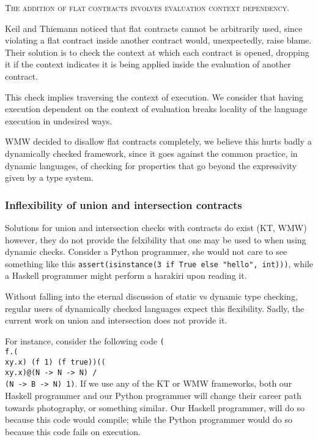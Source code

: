 \textsc{The addition of flat contracts involves evaluation context dependency.}

Keil and Thiemann noticed that flat contracts cannot be arbitrarily used, since
violating a flat contract inside another contract would, unexpectedly, raise blame.
Their solution is to check the context at which each contract is opened, dropping
it if the context indicates it is being applied inside the evaluation of another
contract.

This check implies traversing the context of execution.
We consider that having execution dependent on the context
of evaluation breaks locality of
the language execution in undesired ways.

WMW decided to disallow flat contracts completely,
we believe this hurts badly a dynamically checked framework, since it goes against
the common practice, in dynamic languages, of checking for properties
that go beyond the expressivity given by a type system.


\subsubsection*{Inflexibility of union and intersection contracts}

Solutions for union and intersection checks with contracts do exist (KT, WMW) however,
they do not provide the felxibility that one may be used to when using dynamic checks.
Consider a Python programmer, she would not care to see something like this
\texttt{assert(isinstance(3 if True else "hello", int)))}, while a Haskell programmer
might perform a harakiri upon reading it.

Without falling into the eternal discussion of static vs dynamic type checking,
regular users of dynamically checked languages expect this flexibility.
Sadly, the current work on union and intersection does not provide it.

For instance, consider the following code
\texttt{(\\f.(\\xy.x) (f 1) (f true))((\\xy.x)@(N -> N -> N) /\\ (N -> B -> N) 1)}.
If we use any of the KT or WMW frameworks, both our Haskell programmer and our
Python programmer will change their career path towards photography, or something
similar.
Our Haskell programmer, will do so because this code would compile;
while the Python programmer would do so because this code fails on execution.

